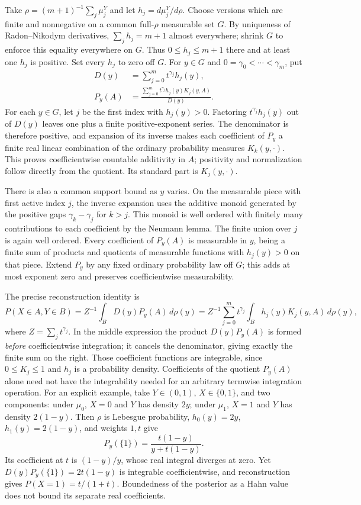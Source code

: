 \documentclass[11pt,a4paper]{article}
\numberwithin{equation}{section}
\theoremstyle{definition}
\theoremstyle{remark}
\begin{document}
Take $\rho=(m+1)^{-1}\sum_j\mu_j^Y$ and let
$h_j=d\mu_j^Y/d\rho$. Choose versions which are finite and nonnegative
on a common full-$\rho$ measurable set $G$. By uniqueness of
Radon--Nikodym derivatives, $\sum_jh_j=m+1$ almost everywhere;
shrink $G$ to enforce this equality everywhere on $G$. Thus
$0\le h_j\le m+1$ there and at least one $h_j$ is positive.
Set every $h_j$ to zero off $G$. For $y\in G$ and
$0=\gamma_0<\cdots<\gamma_m$, put
\begin{align}
 D(y)&=\sum_{j=0}^m t^{\gamma_j}h_j(y),\label{fsp:eq:kerneldensity}\\
 P_y(A)&=\frac{\sum_{j=0}^m t^{\gamma_j}h_j(y)K_j(y,A)}{D(y)}.
 \label{fsp:eq:posterior}
\end{align}
For each $y\in G$, let $j$ be the first index with $h_j(y)>0$.
Factoring $t^{\gamma_j}h_j(y)$ out of $D(y)$ leaves one plus a
finite positive-exponent series. The denominator is therefore positive,
and expansion of its inverse makes each coefficient of $P_y$ a finite
real linear combination of the ordinary probability measures
$K_k(y,\cdot)$. This proves coefficientwise countable additivity in
$A$; positivity and normalization follow directly from the quotient.
Its standard part is $K_j(y,\cdot)$.

There is also a common support bound as $y$ varies. On the measurable
piece with first active index $j$, the inverse expansion uses the additive
monoid generated by the positive gaps
$\gamma_k-\gamma_j$ for $k>j$. This monoid is well ordered with
finitely many contributions to each coefficient by the Neumann lemma.
The finite union over $j$ is again well ordered. Every coefficient of
$P_y(A)$ is measurable in $y$, being a finite sum of products and
quotients of measurable functions with $h_j(y)>0$ on that piece.
Extend $P_y$ by any fixed ordinary probability law off $G$; this adds
at most exponent zero and preserves coefficientwise measurability.

The precise reconstruction identity is
\begin{equation}\label{fsp:eq:kernelreconstruction}
 P(X\in A,Y\in B)
 =Z^{-1}\int_B D(y)P_y(A)\,d\rho(y)
 =Z^{-1}\sum_{j=0}^m t^{\gamma_j}
             \int_B h_j(y)K_j(y,A)\,d\rho(y),
\end{equation}
where $Z=\sum_jt^{\gamma_j}$. In the middle expression the product
$D(y)P_y(A)$ is formed \emph{before} coefficientwise integration;
it cancels the denominator, giving exactly the finite sum on the right.
Those coefficient functions are integrable, since $0\le K_j\le1$ and
$h_j$ is a probability density. Coefficients of the quotient
$P_y(A)$ alone need not have the integrability needed for an arbitrary
termwise integration operation. For an explicit example, take
$Y\in(0,1)$, $X\in\{0,1\}$, and two components: under $\mu_0$,
$X=0$ and $Y$ has density $2y$; under $\mu_1$, $X=1$ and $Y$
has density $2(1-y)$. Then $\rho$ is Lebesgue probability,
$h_0(y)=2y$, $h_1(y)=2(1-y)$, and weights $1,t$ give
\[
 P_y(\{1\})=\frac{t(1-y)}{y+t(1-y)}.
\]
Its coefficient at $t$ is $(1-y)/y$, whose real integral diverges at
zero. Yet $D(y)P_y(\{1\})=2t(1-y)$ is integrable coefficientwise,
and reconstruction gives $P(X=1)=t/(1+t)$. Boundedness of the
posterior as a Hahn value does not bound its separate real coefficients.
\end{document}
